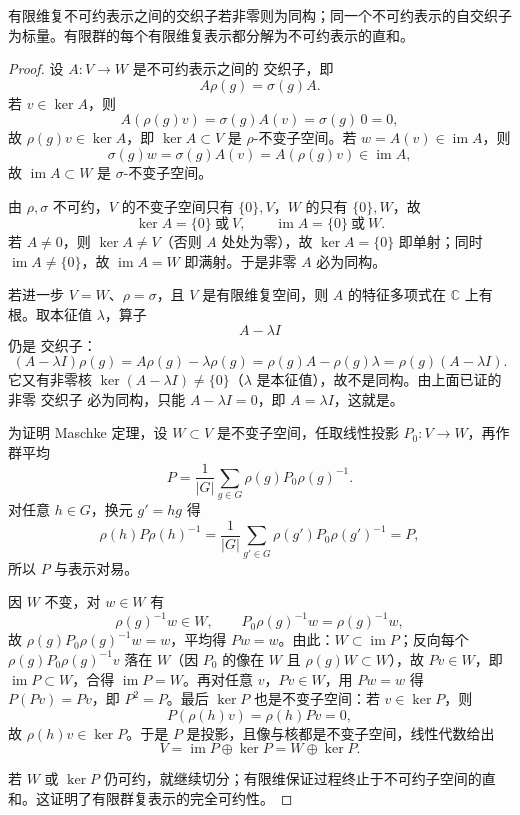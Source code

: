 \begin{theorem}
有限维复不可约表示之间的交织子若非零则为同构；同一个不可约表示的自交织子为标量。有限群的每个有限维复表示都分解为不可约表示的直和。
\end{theorem}
\begin{proof}
设 $A:V\to W$ 是不可约表示之间的 交织子，即
\[
A\rho(g)=\sigma(g)A.
\]
若 $v\in\ker A$，则
\begin{equation*}
  A(\rho(g)v)=\sigma(g)A(v)=\sigma(g)\,0=0,
\end{equation*}
故 $\rho(g)v\in\ker A$，即 $\ker A\subset V$ 是 $\rho$-不变子空间。若 $w=A(v)\in\operatorname{im}A$，则
\begin{equation*}
  \sigma(g)w=\sigma(g)A(v)=A(\rho(g)v)\in\operatorname{im}A,
\end{equation*}
故 $\operatorname{im}A\subset W$ 是 $\sigma$-不变子空间。

由 $\rho,\sigma$ 不可约，$V$ 的不变子空间只有 $\{0\},V$，$W$ 的只有 $\{0\},W$，故
\[
\ker A=\{0\}\ \text{或}\ V,
\qquad
\operatorname{im}A=\{0\}\ \text{或}\ W.
\]
若 $A\neq0$，则 $\ker A\neq V$（否则 $A$ 处处为零），故 $\ker A=\{0\}$ 即单射；同时 $\operatorname{im}A\neq\{0\}$，故 $\operatorname{im}A=W$ 即满射。于是非零 $A$ 必为同构。

若进一步 $V=W$、$\rho=\sigma$，且 $V$ 是有限维复空间，则 $A$ 的特征多项式在 $\mathbb C$ 上有根。取本征值 $\lambda$，算子
\[
A-\lambda I
\]
仍是 交织子：
\begin{equation*}
  (A-\lambda I)\rho(g)
  =A\rho(g)-\lambda\rho(g)
  =\rho(g)A-\rho(g)\lambda
  =\rho(g)(A-\lambda I).
\end{equation*}
它又有非零核 $\ker(A-\lambda I)\neq\{0\}$（$\lambda$ 是本征值），故不是同构。由上面已证的非零 交织子 必为同构，只能 $A-\lambda I=0$，即 $A=\lambda I$，这就是。

为证明 Maschke 定理，设 $W\subset V$ 是不变子空间，任取线性投影 $P_0:V\to W$，再作群平均
\[
P=\frac1{|G|}\sum_{g\in G}
\rho(g)P_0\rho(g)^{-1}.
\]
对任意 $h\in G$，换元 $g'=hg$ 得
\[
\rho(h)P\rho(h)^{-1}
=\frac1{|G|}\sum_{g'\in G}
\rho(g')P_0\rho(g')^{-1}
=P,
\]
所以 $P$ 与表示对易。

因 $W$ 不变，对 $w\in W$ 有
\[
\rho(g)^{-1}w\in W,
\qquad
P_0\rho(g)^{-1}w=\rho(g)^{-1}w,
\]
故 $\rho(g)P_0\rho(g)^{-1}w=w$，平均得 $Pw=w$。由此：$W\subset\operatorname{im}P$；反向每个 $\rho(g)P_0\rho(g)^{-1}v$ 落在 $W$（因 $P_0$ 的像在 $W$ 且 $\rho(g)W\subset W$），故 $P v\in W$，即 $\operatorname{im}P\subset W$，合得 $\operatorname{im}P=W$。再对任意 $v$，$P v\in W$，用 $Pw=w$ 得 $P(P v)=P v$，即 $P^2=P$。最后 $\ker P$ 也是不变子空间：若 $v\in\ker P$，则
\begin{equation*}
  P(\rho(h)v)=\rho(h)P v=0,
\end{equation*}
故 $\rho(h)v\in\ker P$。于是 $P$ 是投影，且像与核都是不变子空间，线性代数给出
\[
V=\operatorname{im}P\oplus\ker P=W\oplus\ker P.
\]

若 $W$ 或 $\ker P$ 仍可约，就继续切分；有限维保证过程终止于不可约子空间的直和。这证明了有限群复表示的完全可约性。
\end{proof}


